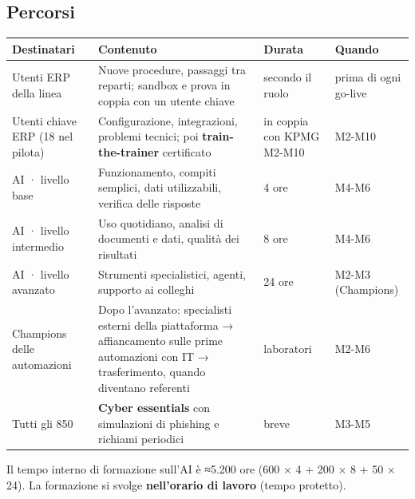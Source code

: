\documentclass[11pt,a4paper]{article}
\begin{document}
\subsection{Percorsi}\label{sec:12.1}

{\small\renewcommand{\arraystretch}{1.25}
\begin{xltabular}{\linewidth}{@{}>{\raggedright\arraybackslash{}\hsize\hspace{0pt}}X>{\raggedright\arraybackslash{}\hsize\hspace{0pt}}X>{\raggedright\arraybackslash{}\hsize\hspace{0pt}}X>{\raggedright\arraybackslash{}\hsize\hspace{0pt}}X@{}}
\toprule
\textbf{Destinatari} & \textbf{Contenuto} & \textbf{Durata} & \textbf{Quando} \\
\midrule
\endhead
Utenti ERP della linea & Nuove procedure, passaggi tra reparti; sandbox e prova in coppia con un utente chiave & secondo il ruolo & prima di ogni go-live \\
Utenti chiave ERP (18 nel pilota) & Configurazione, integrazioni, problemi tecnici; poi \textbf{train-the-trainer} certificato & in coppia con KPMG M2-M10 & M2-M10 \\
AI · livello base & Funzionamento, compiti semplici, dati utilizzabili, verifica delle risposte & 4 ore & M4-M6 \\
AI · livello intermedio & Uso quotidiano, analisi di documenti e dati, qualità dei risultati & 8 ore & M4-M6 \\
AI · livello avanzato & Strumenti specialistici, agenti, supporto ai colleghi & 24 ore & M2-M3 (Champions) \\
Champions delle automazioni & Dopo l'avanzato: specialisti esterni della piattaforma → affiancamento sulle prime automazioni con IT → trasferimento, quando diventano referenti & laboratori & M2-M6 \\
Tutti gli 850 & \textbf{Cyber essentials} con simulazioni di phishing e richiami periodici & breve & M3-M5 \\
\bottomrule
\end{xltabular}}

Il tempo interno di formazione sull'AI è ≈5.200 ore (600 × 4 + 200 × 8 + 50 × 24). La formazione si svolge \textbf{nell'orario di lavoro} (tempo protetto).
\end{document}
